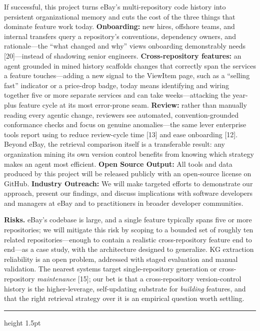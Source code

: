 \documentclass[11pt, letterpaper]{article}
\newcommand{\ehr}{{\color{gray!60}\hrule height 1.5pt}}
\begin{document}
If successful, this project turns eBay's multi-repository code history into persistent organizational memory and cuts the cost of the three things that dominate feature work today. \textbf{Onboarding:} new hires, offshore teams, and internal transfers query a repository's conventions, dependency owners, and rationale---the ``what changed and why'' views onboarding demonstrably needs [20]---instead of shadowing senior engineers. \textbf{Cross-repository features:} an agent grounded in mined history scaffolds changes that correctly span the services a feature touches---adding a new signal to the ViewItem page, such as a ``selling fast'' indicator or a price-drop badge, today means identifying and wiring together five or more separate services and can take weeks---attacking the year-plus feature cycle at its most error-prone seam. \textbf{Review:} rather than manually reading every agentic change, reviewers see automated, convention-grounded conformance checks and focus on genuine anomalies---the same lever enterprise tools report using to reduce review-cycle time [13] and ease onboarding [12]. Beyond eBay, the retrieval comparison itself is a transferable result: any organization mining its own version control benefits from knowing which strategy makes an agent most efficient. \textbf{Open Source Output:} All tools and data produced by this project will be released publicly with an open-source license on GitHub. \textbf{Industry Outreach:} We will make targeted efforts to demonstrate our approach, present our findings, and discuss implications with software developers and managers at eBay and to practitioners in broader developer communities.

\textbf{Risks.} eBay's codebase is large, and a single feature typically spans five or more repositories; we will mitigate this risk by scoping to a bounded set of roughly ten related repositories---enough to contain a realistic cross-repository feature end to end---as a case study, with the architecture designed to generalize. KG extraction reliability is an open problem, addressed with staged evaluation and manual validation. The nearest systems target single-repository generation or cross-repository \emph{maintenance} [15]; our bet is that a cross-repository version-control history is the higher-leverage, self-updating substrate for \emph{building} features, and that the right retrieval strategy over it is an empirical question worth settling.

\ehr

\end{document}

